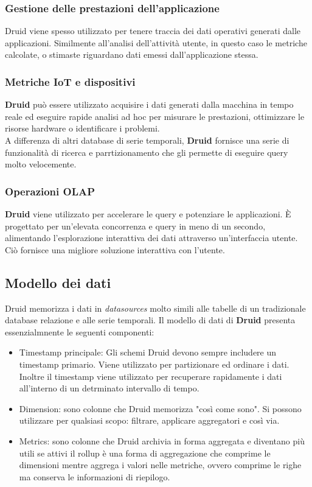 \documentclass{article}
\begin{document}
\subsubsection{Gestione delle prestazioni dell'applicazione}
Druid viene spesso utilizzato per tenere traccia dei dati operativi generati dalle applicazioni.
Similmente all'analisi dell'attività utente, in questo caso le metriche calcolate, o stimaste riguardano dati emessi dall'applicazione stessa.
\subsubsection{Metriche IoT e dispositivi}
\textbf{Druid} può essere utilizzato acquisire i dati generati dalla macchina in tempo reale ed eseguire rapide analisi ad hoc per misurare le prestazioni, ottimizzare le risorse hardware o identificare i problemi.\\
A differenza di altri database di serie temporali, \textbf{Druid} fornisce una serie di funzionalità di ricerca e parrtizionamento che gli permette di eseguire query molto velocemente.
\subsubsection{Operazioni OLAP}
\textbf{Druid} viene utilizzato per accelerare le query e potenziare le applicazioni. È progettato per un'elevata concorrenza e query in meno di un secondo, alimentando l'esplorazione interattiva dei dati attraverso un'interfaccia utente. Ciò fornisce una migliore soluzione interattiva con l'utente.
\subsection{Modello dei dati}
Druid memorizza i dati in \textit{datasources} molto simili alle tabelle di un tradizionale database relazione e alle serie temporali.
Il modello di dati di \textbf{Druid} presenta essenzialmnente le seguenti componenti:
\begin{itemize}
    \item Timestamp principale: Gli schemi Druid devono sempre includere un timestamp primario. Viene utilizzato per partizionare ed ordinare i dati. Inoltre il timestamp viene utilizzato per recuperare rapidamente i dati all'interno di un detrminato intervallo di tempo.
    \item Dimension: sono colonne che Druid memorizza "così come sono". Si possono utilizzare per qualsiasi scopo: filtrare, applicare aggregatori e così via.
    \item Metrics: sono colonne che Druid archivia in forma aggregata e diventano più utili se attivi il rollup è una forma di aggregazione che comprime le dimensioni mentre aggrega i valori nelle metriche, ovvero comprime le righe ma conserva le informazioni di riepilogo.
\end{itemize}
\end{document}
